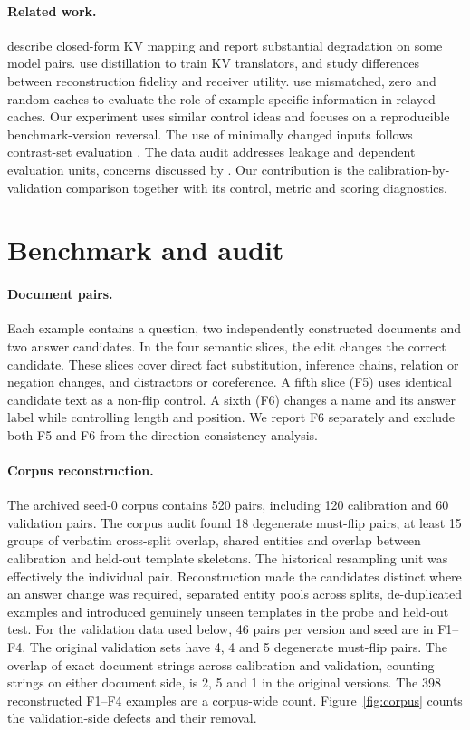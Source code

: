\documentclass[10pt]{article}
\begin{document}
\paragraph{Related work.}
\citet{heo2026} describe closed-form KV mapping and report substantial degradation on some model pairs. \citet{kvlingo} use distillation to train KV translators, and \citet{cachelink} study differences between reconstruction fidelity and receiver utility. \citet{cheng2026} use mismatched, zero and random caches to evaluate the role of example-specific information in relayed caches. Our experiment uses similar control ideas and focuses on a reproducible benchmark-version reversal. The use of minimally changed inputs follows contrast-set evaluation \citep{contrastsets}. The data audit addresses leakage and dependent evaluation units, concerns discussed by \citet{kapoor2023}. Our contribution is the calibration-by-validation comparison together with its control, metric and scoring diagnostics.

\section{Benchmark and audit}

\paragraph{Document pairs.}
Each example contains a question, two independently constructed documents and two answer candidates. In the four semantic slices, the edit changes the correct candidate. These slices cover direct fact substitution, inference chains, relation or negation changes, and distractors or coreference. A fifth slice (F5) uses identical candidate text as a non-flip control. A sixth (F6) changes a name and its answer label while controlling length and position. We report F6 separately and exclude both F5 and F6 from the direction-consistency analysis.

\paragraph{Corpus reconstruction.}
The archived seed-0 corpus contains 520 pairs, including 120 calibration and 60 validation pairs. The corpus audit found 18 degenerate must-flip pairs, at least 15 groups of verbatim cross-split overlap, shared entities and overlap between calibration and held-out template skeletons. The historical resampling unit was effectively the individual pair. Reconstruction made the candidates distinct where an answer change was required, separated entity pools across splits, de-duplicated examples and introduced genuinely unseen templates in the probe and held-out test. For the validation data used below, 46 pairs per version and seed are in F1--F4. The original validation sets have 4, 4 and 5 degenerate must-flip pairs. The overlap of exact document strings across calibration and validation, counting strings on either document side, is 2, 5 and 1 in the original versions. The 398 reconstructed F1--F4 examples are a corpus-wide count. Figure~\ref{fig:corpus} counts the validation-side defects and their removal.
\end{document}
